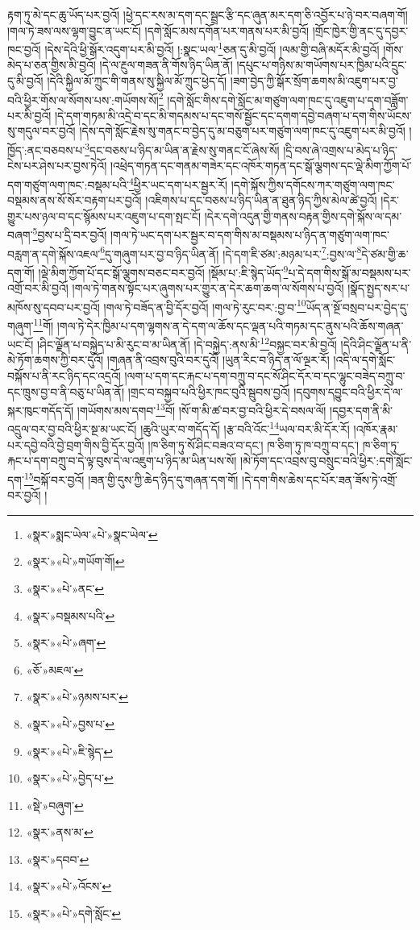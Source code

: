 རྟག་ཏུ་མེ་དང་ཆུ་ཡོད་པར་བྱའོ། །ཕྱེ་དང་རས་མ་དག་དང་སྦྲང་རྩི་དང་ཞུན་མར་དག་ཅི་འབྱོར་པ་ཉེ་བར་བཞག་གོ། །གལ་ཏེ་ཟས་ལས་ལྷག་བྱུང་ན་ཡང་ངོ། །དགེ་སློང་མས་དགོན་པར་གནས་པར་མི་བྱའོ། །གྲོང་ཁྱེར་གྱི་ནང་དུ་དབྱར་ཁང་བྱའོ། །དེས་དེའི་ཕྱི་སྒོར་འདུག་པར་མི་བྱའོ། །:སྣང་ཡལ་\footnote{«སྣར་»སྨང་ཡེལ་«པེ་»སྣང་ཡེལ་}ཅན་དུ་མི་བྱའོ། །ལམ་གྱི་བཞི་མདོར་མི་བྱའོ། །གོས་མེད་པ་ཅན་གྱིས་མི་བྱའོ། །དེ་ལ་རྔུལ་གཟན་ནི་གོས་ཉིད་ཡིན་ནོ། །དཔུང་པ་གཉིས་མ་གཡོགས་པར་ཁྱིམ་པའི་དྲུང་དུ་མི་བྱའོ། །དེའི་སྐྱིལ་མོ་ཀྲུང་གི་གནས་སུ་སྐྱིལ་མོ་ཀྲུང་ཕྱེད་དོ། །ཟག་བྱེད་ཀྱི་སྒོར་སྲོག་ཆགས་མི་འཇུག་པར་བྱ་བའི་ཕྱིར་གོས་ལ་སོགས་པས་:གཡོགས་སོ།\footnote{«སྣར་»«པེ་»གཡོག་གོ།} །དགེ་སློང་གིས་དགེ་སློང་མ་གཙུག་ལག་ཁང་དུ་འཇུག་པ་དག་བཟློག་པར་མི་བྱའོ། །དེ་དག་གཏམ་མི་འདྲེ་བ་དང་མི་གདམས་པ་དང་གསོ་སྦྱོང་དང་དགག་དབྱེ་བཞག་པ་དག་གིས་ཡོངས་སུ་གདུལ་བར་བྱའོ། །དེས་དགེ་སློང་རྗེས་སུ་གནང་བ་བྱེད་དུ་མ་བཅུག་པར་གཙུག་ལག་ཁང་དུ་འཇུག་པར་མི་བྱའོ། །ཁྱོད་:ནང་བཅབས་པ་\footnote{«སྣར་»«པེ་»ནང་}དང་བཅས་པ་ཉིད་མ་ཡིན་ན་རྗེས་སུ་གནང་ངོ་ཞེས་སོ། །དྲི་བས་ཞེ་འགྲས་པ་མེད་པ་ཉིད་ངེས་པར་ཤེས་པར་བྱས་ཏེའོ། །འཕྲེད་གཏན་དང་གནམ་གཟེར་དང་འཁོར་གཏན་དང་སྒོ་ལྕགས་དང་ལྡེ་མིག་ཀྱོག་པོ་དག་གཙུག་ལག་ཁང་:བསྡམ་པའི་\footnote{«སྣར་»བསྡམས་པའི་}ཕྱིར་ཡང་དག་པར་སྦྱར་རོ། །དགེ་སྐོས་ཀྱིས་དགོངས་ཀར་གཙུག་ལག་ཁང་བསྡམས་ནས་སོ་སོར་བརྟག་པར་བྱའོ། །འཇིགས་པ་དང་བཅས་པ་ཉིད་ཡིན་ན་ཐུན་ཉིད་ཀྱིས་མེལ་ཚེ་བྱའོ། །དེར་གྱུར་པས་ཉལ་བ་དང་སྙོམས་པར་འཇུག་པ་དག་སྤང་ངོ། །དེར་དགེ་འདུན་གྱི་གནས་བརྟན་གྱིས་དགེ་སྐོས་ལ་དམ་བཞག་\footnote{«སྣར་»«པེ་»ཞག་}བྱས་པ་དྲི་བར་བྱའོ། །གལ་ཏེ་ཡང་དག་པར་སྦྱར་བ་དག་གིས་མ་བསྡམས་པ་ཉིད་ན་གཙུག་ལག་ཁང་བརླག་ན་དགེ་སྐོས་འཇལ་\footnote{«ཅོ་»མཇལ་}དུ་གཞུག་པར་བྱ་བ་ཉིད་ཡིན་ནོ། །དེ་དག་ཇི་ཙམ་:མཉམ་པར་\footnote{«སྣར་»«པེ་»ཉམས་པར་}:བྱས་ལ་\footnote{«སྣར་»«པེ་»བྱས་པ་}དེ་ཙམ་གྱི་ཆ་དག་གོ། །ལྡེ་མིག་ཀྱོག་པོ་དང་སྒོ་ལྕགས་བཅང་བར་བྱའོ། །སྡོམ་པ་:ཇི་སྙེད་ཡོད་\footnote{«སྣར་»«པེ་»ཇི་སྙེད་}པ་དེ་དག་གིས་སྒོ་མ་བསྡམས་པར་འགྲོ་བར་མི་བྱའོ། །གལ་ཏེ་གནས་སྟོང་པར་ཞུགས་པར་གྱུར་ན་དེར་ཆག་ཆག་ལ་སོགས་པ་བྱའོ། །སྣོད་སྤྱད་སར་པ་མཁོས་སུ་དབབ་པར་བྱའོ། །གལ་ཏེ་བཟོད་ན་བྱི་དོར་བྱའོ། །གལ་ཏེ་རུང་བར་:བྱ་བ་\footnote{«སྣར་»«པེ་»བྱེད་པ་}ཡོད་ན་སྔོ་བསྲབ་པར་བྱེད་དུ་གཞུག་\footnote{«སྡེ་»བཞུག་}གོ། །གལ་ཏེ་དེར་ཁྱིམ་པ་དག་ལྷགས་ན་དེ་དག་ལ་ཆོས་དང་ལྡན་པའི་གཏམ་དང་ནུས་པའི་ཆོས་གཞན་ཡང་ངོ། །ཤིང་ལྗོན་པ་བསྐྱེད་པ་མི་རུང་བ་མ་ཡིན་ནོ། །དེ་བསྐྱེད་:ནས་མི་\footnote{«སྣར་»ནས་མ་}བསྐྱང་བར་མི་བྱའོ། །དེའི་ཤིང་ལྗོན་པ་ནི་མེ་ཏོག་ཆགས་ཀྱི་བར་དུའོ། །གཞན་ནི་འབྲས་བུའི་བར་དུའོ། །ཡུན་རིང་བ་ཉིད་ན་ལོ་ལྔར་རོ། །འདི་ལ་དགེ་སློང་བསྐོས་པ་ནི་རང་ཉིད་དང་འདྲའོ། །ལག་པ་དག་དང་རྐང་པ་དག་བཀྲུ་བ་དང་སོ་ཤིང་དོར་བ་དང་ལྷུང་བཟེད་བཀྲུ་བ་དང་ཁྲུས་བྱ་བ་ནི་བཅུ་པ་ཡིན་ནོ། །གྲང་བ་བསྐྱབ་པའི་ཕྱིར་ཁང་བུའི་སྦུབས་བྱའོ། །དབུགས་དབྱུང་བའི་ཕྱིར་དེ་ལ་སྐར་ཁུང་གདོད་དོ། །གཡོགས་མས་དགབ་\footnote{«སྣར་»དབབ་}བོ། །སོ་ག་མི་ཚ་བར་བྱ་བའི་ཕྱིར་དེ་བསལ་ལོ། །དབྱར་དག་ནི་མི་འདྲུལ་བར་བྱ་བའི་ཕྱིར་སྔ་མ་ཡང་ངོ། །ཆུའི་ཡུར་བ་གདོད་དོ། །རྩ་བའི་འོང་\footnote{«སྣར་»«པེ་»འོངས་}ཡལ་བར་མི་དོར་རོ། །འཁོར་རྣམ་པར་དབྱེ་བའི་བྱེ་བྲག་གིས་བྱི་དོར་བྱའོ། །ཁ་ཅིག་ཏུ་སོ་ཤིང་བཟའ་བ་དང་། ཁ་ཅིག་ཏུ་ཁ་བཀྲུ་བ་དང་། ཁ་ཅིག་ཏུ་རྐང་པ་དག་བཀྲུ་བ་དེ་ལྟ་བུས་དེ་ལ་འཇུག་པ་ཉིད་མ་ཡིན་པས་སོ། །མེ་ཏོག་དང་འབྲས་བུ་བསྲུང་བའི་ཕྱིར་:དགེ་སློང་དག་\footnote{«སྣར་»«པེ་»དགེ་སློང་}བསྐོ་བར་བྱའོ། །ཟན་གྱི་དུས་ཀྱི་ཆེད་ཉིད་དུ་གཞན་དག་གོ། །དེ་དག་གིས་ཆེས་དང་པོར་ཟན་ཟོས་ཏེ་འགྲོ་བར་བྱའོ། །
